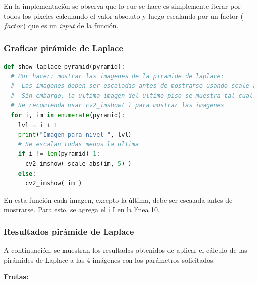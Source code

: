 \documentclass[12pt, letterpaper]{article}
\begin{document}
\par En la implementación se observa que lo que se hace es simplemente iterar por todos los pixeles calculando el valor absoluto y luego escalando por un factor ($factor$) que es un \textit{input} de la función. 

\subsubsection{Graficar pirámide de Laplace}
\begin{lstlisting}[language=Python, label = showlpCode, caption=Función para graficar pirámide de Laplace.]
def show_laplace_pyramid(pyramid):
  # Por hacer: mostrar las imagenes de la piramide de laplace:
  #  Las imagenes deben ser escaladas antes de mostrarse usando scale_abs
  #  Sin embargo, la ultima imagen del ultimo piso se muestra tal cual
  # Se recomienda usar cv2_imshow( ) para mostrar las imagenes
  for i, im in enumerate(pyramid):
    lvl = i + 1
    print("Imagen para nivel ", lvl)
    # Se escalan todas menos la ultima
    if i != len(pyramid)-1:
      cv2_imshow( scale_abs(im, 5) )
    else:
      cv2_imshow( im ) 
\end{lstlisting}

\par En esta función cada imagen, excepto la última, debe ser escalada antes de mostrarse. Para esto, se agrega el \texttt{if} en la línea 10. 

\subsubsection{Resultados pirámide de Laplace}
A continuación, se muestran los resultados obtenidos de aplicar el cálculo de las pirámides de Laplace a las 4 imágenes con los parámetros solicitados:

\par \textbf{Frutas:}
\end{document}
